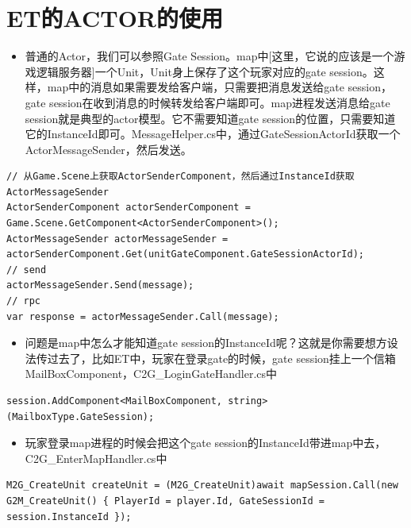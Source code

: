 \documentclass[9pt, b5paper]{article}
\begin{document}
\section{ET的ACTOR的使用}
\label{sec-25}
\begin{itemize}
\item 普通的Actor，我们可以参照Gate Session。map中[这里，它说的应该是一个游戏逻辑服务器]一个Unit，Unit身上保存了这个玩家对应的gate session。这样，map中的消息如果需要发给客户端，只需要把消息发送给gate session，gate session在收到消息的时候转发给客户端即可。map进程发送消息给gate session就是典型的actor模型。它不需要知道gate session的位置，只需要知道它的InstanceId即可。MessageHelper.cs中，通过GateSessionActorId获取一个ActorMessageSender，然后发送。
\end{itemize}
\begin{verbatim}
// 从Game.Scene上获取ActorSenderComponent，然后通过InstanceId获取ActorMessageSender
ActorSenderComponent actorSenderComponent = Game.Scene.GetComponent<ActorSenderComponent>();
ActorMessageSender actorMessageSender = actorSenderComponent.Get(unitGateComponent.GateSessionActorId);
// send
actorMessageSender.Send(message);
// rpc
var response = actorMessageSender.Call(message);
\end{verbatim}
\begin{itemize}
\item 问题是map中怎么才能知道gate session的InstanceId呢？这就是你需要想方设法传过去了，比如ET中，玩家在登录gate的时候，gate session挂上一个信箱MailBoxComponent，C2G\_LoginGateHandler.cs中
\end{itemize}
\begin{verbatim}
session.AddComponent<MailBoxComponent, string>(MailboxType.GateSession);
\end{verbatim}
\begin{itemize}
\item 玩家登录map进程的时候会把这个gate session的InstanceId带进map中去，C2G\_EnterMapHandler.cs中
\end{itemize}
\begin{verbatim}
M2G_CreateUnit createUnit = (M2G_CreateUnit)await mapSession.Call(new G2M_CreateUnit() { PlayerId = player.Id, GateSessionId = session.InstanceId });
\end{verbatim}
\end{document}
